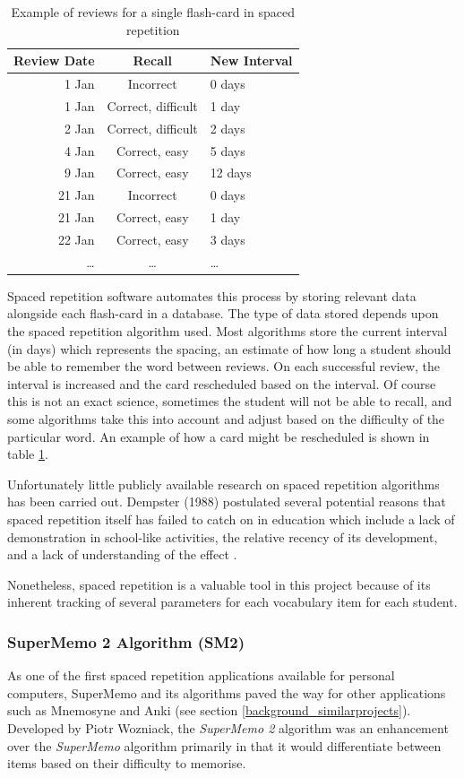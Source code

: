 \begin{table}[h!]
\caption{Example of reviews for a single flash-card in spaced repetition}
\label{tbl_spacedrepetitionexample}
\begin{tabular}{|r|c|l|}
\hline
Review Date & Recall & New Interval \\
\hline
1 Jan & Incorrect & 0 days \\
1 Jan & Correct, difficult & 1 day \\
2 Jan & Correct, difficult & 2 days \\
4 Jan & Correct, easy & 5 days \\
9 Jan & Correct, easy & 12 days \\
21 Jan & Incorrect & 0 days \\
21 Jan & Correct, easy & 1 day \\
22 Jan & Correct, easy & 3 days \\
\ldots & \ldots & \ldots \\
\hline
\end{tabular}
\end{table}

Spaced repetition software automates this process by storing relevant data alongside each
flash-card in a database. The type of data stored depends upon the spaced repetition algorithm
used. Most algorithms store the current interval (in days) which represents the spacing,
an estimate of how long a student should be able to remember the word between reviews.
On each successful review, the interval is increased and the card rescheduled based on
the interval. Of course this is not an exact science, sometimes the student will not be able to recall,
and some algorithms take this into account and adjust based on the difficulty of the
particular word. An example of how a card might be rescheduled
is shown in table \ref{tbl_spacedrepetitionexample}.

Unfortunately little publicly available research on spaced repetition
algorithms has been carried out. Dempster (1988)
postulated several potential reasons that spaced repetition itself has failed 
to catch on in education which include a lack of demonstration in school-like activities, the
relative recency of its development, and a lack of understanding of the effect
\cite{dempster_spacing_effect_1988}.
 
Nonetheless, spaced repetition is a valuable tool in this project because of its
inherent tracking of several parameters for each vocabulary item for each student.

\subsubsection*{SuperMemo 2 Algorithm (SM2)}
As one of the first spaced repetition applications available for personal computers, %
SuperMemo and its algorithms paved the way for other applications such as Mnemosyne and
Anki (see section \ref{background_similarprojects}). Developed by Piotr
Wozniack\cite{wozniak_optimization_1990}, the \textit{SuperMemo 2} algorithm was an
enhancement over the \textit{SuperMemo} algorithm primarily in that it would differentiate 
between items based on their difficulty to memorise\cite{wozniak_optimization_1990}.

